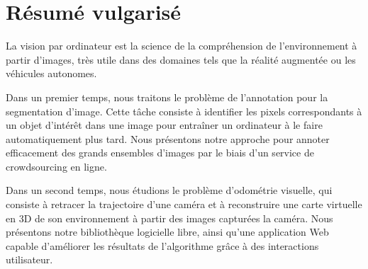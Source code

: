 \section*{Résumé vulgarisé}%
\label{sec:pop-abstract}

La vision par ordinateur est la science de la compréhension de l'environnement à partir d'images,
très utile dans des domaines tels que la réalité augmentée ou les véhicules autonomes.

Dans un premier temps, nous traitons le problème de l'annotation pour la segmentation d'image.
Cette tâche consiste à identifier les pixels correspondants
à un objet d'intérêt dans une image pour entraîner un ordinateur à
le faire automatiquement plus tard.
Nous présentons notre approche pour annoter efficacement des grands ensembles d'images
par le biais d'un service de crowdsourcing en ligne.

Dans un second temps, nous étudions le problème d'odométrie visuelle,
qui consiste à retracer la trajectoire d'une caméra et à reconstruire
une carte virtuelle en 3D de son environnement à partir des images capturées la caméra.
Nous présentons notre bibliothèque logicielle libre, ainsi qu'une application Web capable
d'améliorer les résultats de l'algorithme grâce à des interactions utilisateur.
